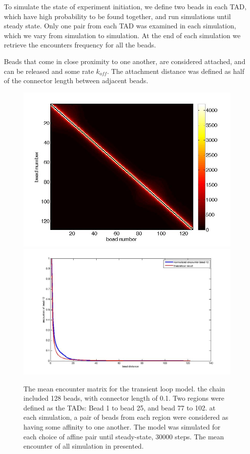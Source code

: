 \documentclass[12pt]{paper}
\begin{document}
To simulate the state of experiment initiation, we define two beads in each TAD, which have high probability to be found together, and run simulations until steady state. Only one pair from each TAD was examined in each simulation, which we vary from simulation to simulation. At the end of each simulation we retrieve the encounters frequency for all the beads. 

Beads that come in close proximity to one another, are considered attached, and can be released and some rate $k_{off}$. The attachment distance was defined as half of the connector length between adjacent beads. 

\begin{figure}[H]
\includegraphics[scale=0.2]{encounterFrequency128beadsWithTadTransientModel}
\includegraphics[scale=0.2]{encounterCrossectionBead12TransientLoopModelwithTheoreticalCurve}
\caption{\scriptsize{The mean encounter matrix for the transient loop model. the chain included 128 beads, with connector length of 0.1. Two regions were defined as the TADs: Bead 1 to bead 25, and bead 77 to 102. at each simulation, a pair of beads from each region were considered as having some affinity to one another. The model was simulated for each choice of affine pair until steady-state, 30000 steps. The mean encounter of all simulation in presented.}} 
\end{figure}
\end{document}
